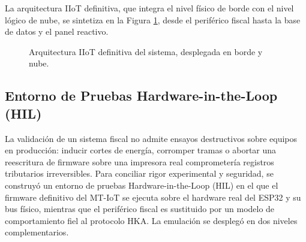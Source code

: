 \par La arquitectura IIoT definitiva, que integra el nivel físico de borde con el nivel lógico de nube, se sintetiza en la Figura \ref{fig:arquitectura_final}, desde el periférico fiscal hasta la base de datos y el panel reactivo.

\begin{figure}[htbp]
\centering
{}
\caption{Arquitectura IIoT definitiva del sistema, desplegada en borde y nube.}
\label{fig:arquitectura_final}
\end{figure}

\subsection{Entorno de Pruebas Hardware-in-the-Loop (HIL)}

\par La validación de un sistema fiscal no admite ensayos destructivos sobre equipos en producción: inducir cortes de energía, corromper tramas o abortar una reescritura de firmware sobre una impresora real comprometería registros tributarios irreversibles. Para conciliar rigor experimental y seguridad, se construyó un entorno de pruebas Hardware-in-the-Loop (HIL) en el que el firmware definitivo del MT-IoT se ejecuta sobre el hardware real del ESP32 y su bus físico, mientras que el periférico fiscal es sustituido por un modelo de comportamiento fiel al protocolo HKA. La emulación se desplegó en dos niveles complementarios.\\

